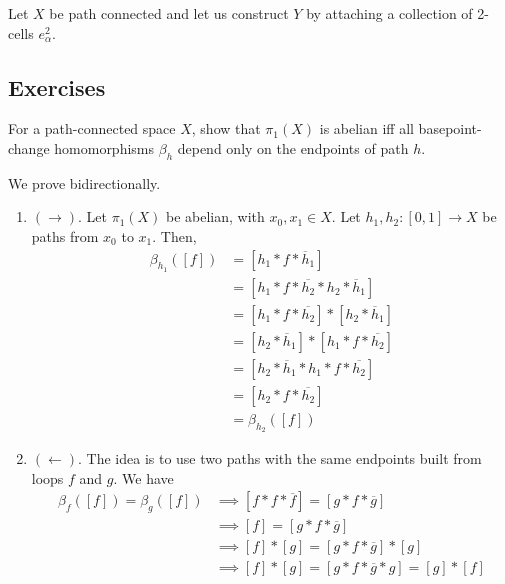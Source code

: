 	\begin{theorem}
	  \label{thm:fundamental-group-after-attaching-cells}
		Let $X$ be path connected and let us construct $Y$ by attaching a collection of 2-cells $e^{2}_\alpha$. 
	\end{theorem}

\subsection{Exercises}

	\begin{exercise}[Hatcher 1.1.3]
	  For a path-connected space $X$, show that $\pi_1 (X)$ is abelian iff all basepoint-change homomorphisms $\beta_h$ depend only on the endpoints of path $h$. 
	\end{exercise}
	\begin{solution}
	  We prove bidirectionally. 
		\begin{enumerate}
			\item $(\rightarrow)$. Let $\pi_1 (X)$ be abelian, with $x_0, x_1 \in X$. Let $h_1, h_2: [0, 1] \to X$ be paths from $x_0$ to $x_1$. Then, 
				\begin{align}
					\beta_{h_1}([f]) & = [h_1 \ast f \ast \overline{h}_1] \\ 
													 & = [h_1 \ast f \ast \overline{h_2} \ast h_2 \ast \overline{h}_1] \\  
													 & = [h_1 \ast f \ast \overline{h_2}] \ast [h_2 \ast \overline{h}_1] \\  
													 & = [h_2 \ast \overline{h}_1] \ast [h_1 \ast f \ast \overline{h_2}] \\ 
													 & = [h_2 \ast \overline{h}_1 \ast h_1 \ast f \ast \overline{h_2}] \\ 
													 & = [h_2 \ast f \ast \overline{h_2}] \\ 
													 & = \beta_{h_2}([f]) 
				\end{align}
			\item $(\leftarrow)$. The idea is to use two paths with the same endpoints built from loops $f$ and $g$. We have 
				\begin{align}
					\beta_f ([f]) = \beta_g([f]) & \implies [f \ast f \ast \overline{f}] = [g \ast f \ast \overline{g}] \\ 
																			 & \implies [f] = [g \ast f \ast \overline{g}] \\ 
																			 & \implies [f] \ast [g] = [g \ast f \ast \overline{g}] \ast [g] \\ 
																			 & \implies [f] \ast [g] = [g \ast f \ast \overline{g} \ast g] = [g] \ast [f]
				\end{align}
		\end{enumerate}
	\end{solution}


